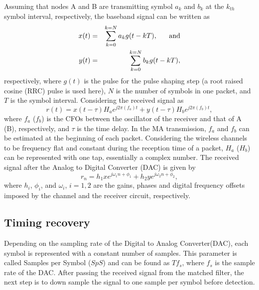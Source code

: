 Assuming that nodes A and B are transmitting symbol $a_k$ and $b_k$ at the $k_{th}$ symbol interval, respectively, the baseband signal can be written as
\begin{eqnarray}
    x(t)&=&\sum_{k=0}^{k=N} a_k g(t-kT), {\rm \ \ \ \ \ and}\\
    y(t)&=&\sum_{k=0}^{k=N} b_k g(t-kT),
\end{eqnarray}
respectively, where $g(t)$ is the pulse for the pulse shaping step (a root raised cosine (RRC) pulse is used here), $N$ is the number of symbols in one packet, and $T$ is the symbol interval. Considering the received signal as
\begin{equation}
    r(t)=x(t- \tau) H_a e^{j2\pi (f_a)t} + y(t - \tau) H_b e^{j2\pi (f_b)t},
\end{equation}
where $f_a$ ($f_b$) is the CFOs between the oscillator of the receiver and  that of A (B), respectively, and $\tau$ is the time delay. In the MA transmission, $f_a$ and $f_b$ can be estimated at the beginning of each packet. Considering the wireless channels to be frequency flat and constant during the reception time of a packet, %
$H_a$ ($H_b$) can be represented with one tap, essentially a complex number. The received signal after the Analog to Digital Converter (DAC) is given by
\begin{equation}
    r_n=h_1 x e^{j \omega_1 n + \phi_1} + h_2 y e^{j \omega_2 n + \phi_2},
\end{equation}
where $h_i$, $\phi_i$, and $\omega_i$, $i=1,2$ are the gains, phases and digital frequency offsets imposed by the channel and  the receiver circuit, respectively. 

\subsection{Timing recovery}

Depending on the sampling rate of the Digital to Analog Converter(DAC), each symbol is represented with a constant number of samples. This parameter is called Samples per Symbol ($SpS$) and can be found as ${T}{f_s}$, where $f_s$ is  the sample rate of the DAC. After passing the received signal from the matched filter, the next step is to down sample the signal to one sample per symbol before detection. 

